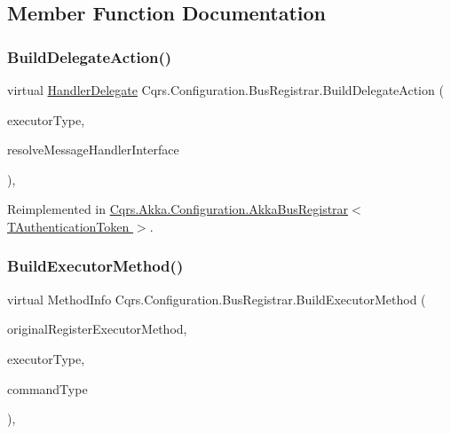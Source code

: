 \subsection{Member Function Documentation}
\mbox{\label{classCqrs_1_1Configuration_1_1BusRegistrar_a07d27088739f2ae0ac7c551fc6a72ac9}} 
\subsubsection{\texorpdfstring{Build\+Delegate\+Action()}{BuildDelegateAction()}}
{\footnotesize\ttfamily virtual \hyperlink{classCqrs_1_1Configuration_1_1HandlerDelegate}{Handler\+Delegate} Cqrs.\+Configuration.\+Bus\+Registrar.\+Build\+Delegate\+Action (\begin{DoxyParamCaption}\item[{Type}]{executor\+Type,  }\item[{Func$<$ Type, I\+Enumerable$<$ Type $>$$>$}]{resolve\+Message\+Handler\+Interface }\end{DoxyParamCaption})\hspace{0.3cm}{\ttfamily [protected]}, {\ttfamily [virtual]}}



Reimplemented in \hyperlink{classCqrs_1_1Akka_1_1Configuration_1_1AkkaBusRegistrar_ad7e3e5d332d5b4d781375a28f23bdb19}{Cqrs.\+Akka.\+Configuration.\+Akka\+Bus\+Registrar$<$ T\+Authentication\+Token $>$}.

\mbox{\label{classCqrs_1_1Configuration_1_1BusRegistrar_a03ecf12389b8f55b75c887e113520ac7}} 
\subsubsection{\texorpdfstring{Build\+Executor\+Method()}{BuildExecutorMethod()}}
{\footnotesize\ttfamily virtual Method\+Info Cqrs.\+Configuration.\+Bus\+Registrar.\+Build\+Executor\+Method (\begin{DoxyParamCaption}\item[{Method\+Info}]{original\+Register\+Executor\+Method,  }\item[{Type}]{executor\+Type,  }\item[{Type}]{command\+Type }\end{DoxyParamCaption})\hspace{0.3cm}{\ttfamily [protected]}, {\ttfamily [virtual]}}

